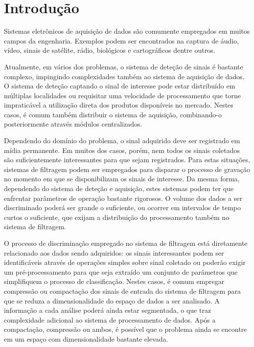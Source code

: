 \typeout{ ====================================================================}
\typeout{ ====================================================================}

\chapter{Introdução}

Sistemas eletrônicos de aquisição de dados são comumente empregados em muitos
campos da engenharia. Exemplos podem ser encontrados na captura de áudio,
vídeo, sinais de satélite, rádio, biológicos e cartográficos dentre outros.

Atualmente, em vários dos problemas, o sistema de deteção de sinais é bastante
complexo, impingindo complexidades também ao sistema de aquisição de dados. O
sistema de deteção captando o sinal de interesse pode estar distribuído em
múltiplas localidades ou requisitar uma velocidade de processamento que torne
impraticável a utilização direta dos produtos disponíveis no mercado. Nestes
casos, é comum também distribuir o sistema de aquisição, combinando-o
posteriormente através módulos centralizados.

Dependendo do domínio do problema, o sinal adquirido deve ser registrado em
mídia permanente. Em muitos dos casos, porém, nem todos os sinais coletados
são suficientemente interessantes para que sejam registrados. Para estas
situações, sistemas de filtragem  podem ser empregados para
disparar o processo de gravação no momento em que se disponibilizam os sinais
de interesse. Da mesma forma, dependendo do sistema de deteção e aquisição,
estes sistemas podem ter que enfrentar parâmetros de operação bastante
rigorosos. O volume dos dados a ser discriminado poderá ser grande o
suficiente, ou ocorrer em intervalos de tempo curtos o suficiente, que exijam
a distribuição do processamento também no sistema de filtragem.

O processo de discriminação empregado no sistema de filtragem está diretamente
relacionado aos dados sendo adquiridos: os sinais interessantes podem ser
identificáveis através de operações simples sobre sinal coletado ou poderão
exigir um pré-processamento para que seja extraído um conjunto de parâmetros
que simplifiquem o processo de classificação. Nestes casos, é comum empregar
compressão ou compactação dos sinais de entrada do sistema de filtragem para
que se reduza a dimensionalidade do espaço de dados a ser analisado. A
informação a cada análise poderá ainda estar segmentada, o que traz
complexidade adicional ao sistema de processamento de dados. Após a
compactação, compressão ou ambos, é possível que o problema ainda se encontre
em um espaço com dimensionalidade bastante elevada. 

